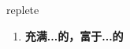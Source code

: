 
\begin{frame}
{\huge replete}
\begin{center}
\begin{enumerate}\Large
  \item \textbf{充满...的，富于...的}
\end{enumerate}
\end{center}
\end{frame}
